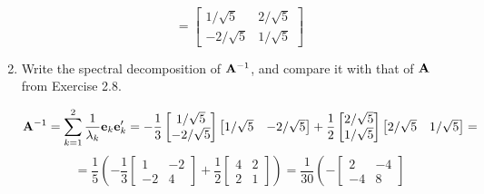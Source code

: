\begin{enumerate}[label=(\alph*)]
\[                =
                \begin{bmatrix}
                    1/\sqrt{5} & 2/\sqrt{5} \\
                    -2/\sqrt{5} & 1/\sqrt{5}
                \end{bmatrix}
            \]
            \item Write the spectral decomposition of $\bold{A}^{-1}$, and compare it with that of $\bold{A}$ from Exercise 2.8.
            \par
            \[
                \bold{A}^{-1} = \sum_{k=1}^2{\frac{1}{\lambda_k}\bold{e}_k\bold{e}_k^\prime} = 
                -\frac{1}{3}
                \begin{bmatrix}
                    1/\sqrt{5} \\
                    -2/\sqrt{5}
                \end{bmatrix}
                \begin{bmatrix}
                    1/\sqrt{5} & -2/\sqrt{5}
                \end{bmatrix}
                +
                \frac{1}{2}
                \begin{bmatrix}
                    2/\sqrt{5} \\
                    1/\sqrt{5}
                \end{bmatrix}
                \begin{bmatrix}
                    2/\sqrt{5} & 1/\sqrt{5}
                \end{bmatrix}
                =
            \]
            \[
                =
                \frac{1}{5}
                \left(
                -\frac{1}{3}
                \begin{bmatrix}
                    1 & -2 \\
                    -2 & 4
                \end{bmatrix}
                +
                \frac{1}{2}
                \begin{bmatrix}
                    4 & 2 \\
                    2 & 1
                \end{bmatrix}
                \right)
                =
                \frac{1}{30}
                \left(
                -
                \begin{bmatrix}
                    2 & -4 \\
                    -4 & 8
                \end{bmatrix}
\]
\end{enumerate}
